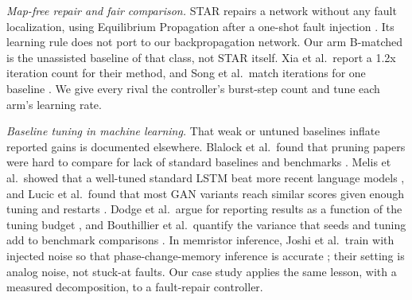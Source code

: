 \documentclass[journal]{IEEEtran}
\begin{document}
\emph{Map-free repair and fair comparison.}
STAR repairs a network without any fault localization, using Equilibrium Propagation after a one-shot fault injection \cite{khan26star}.
Its learning rule does not port to our backpropagation network.
Our arm B-matched is the unassisted baseline of that class, not STAR itself.
Xia et al.\ report a 1.2x iteration count for their method, and Song et al.\ match iterations for one baseline \cite{xia19tcad,song21ittrna}.
We give every rival the controller's burst-step count and tune each arm's learning rate.

\emph{Baseline tuning in machine learning.}
That weak or untuned baselines inflate reported gains is documented elsewhere.
Blalock et al.\ found that pruning papers were hard to compare for lack of standard baselines and benchmarks \cite{blalock20pruning}.
Melis et al.\ showed that a well-tuned standard LSTM beat more recent language models \cite{melis18ppl}, and Lucic et al.\ found that most GAN variants reach similar scores given enough tuning and restarts \cite{lucic18gans}.
Dodge et al.\ argue for reporting results as a function of the tuning budget \cite{dodge19work}, and Bouthillier et al.\ quantify the variance that seeds and tuning add to benchmark comparisons \cite{bouthillier21variance}.
In memristor inference, Joshi et al.\ train with injected noise so that phase-change-memory inference is accurate \cite{joshi20pcm}; their setting is analog noise, not stuck-at faults.
Our case study applies the same lesson, with a measured decomposition, to a fault-repair controller.
\end{document}

